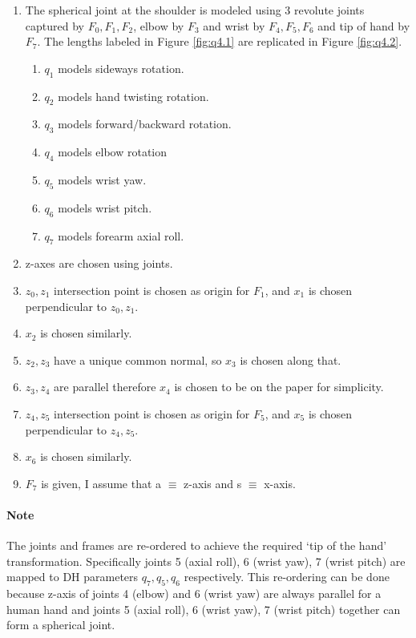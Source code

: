 \documentclass[12pt]{article}
\begin{document}
\begin{enumerate}[nolistsep]
  \item The spherical joint at the shoulder is modeled using 3 revolute joints captured by $F_0, F_1, F_2$, elbow by $F_3$ and wrist by $F_4, F_5, F_6$ and tip of hand by $F_7$. The lengths labeled in Figure \ref{fig:q4.1} are replicated in Figure \ref{fig:q4.2}.
    \begin{enumerate}[nolistsep]
      \item $q_1$ models sideways rotation.
      \item $q_2$ models hand twisting rotation.
      \item $q_3$ models forward/backward rotation.
      \item $q_4$ models elbow rotation
      \item $q_5$ models wrist yaw.
      \item $q_6$ models wrist pitch.
      \item $q_7$ models forearm axial roll.
    \end{enumerate}
  \item z-axes are chosen using joints.
  \item $z_0, z_1$ intersection point is chosen as origin for $F_1$, and $x_1$ is chosen perpendicular to $z_0, z_1$.
  \item $x_2$ is chosen similarly.
  \item $z_2, z_3$ have a unique common normal, so $x_3$ is chosen along that.
  \item $z_3, z_4$ are parallel therefore $x_4$ is chosen to be on the paper for simplicity.
  \item $z_4, z_5$ intersection point is chosen as origin for $F_5$, and $x_5$ is chosen perpendicular to $z_4, z_5$.
  \item $x_6$ is chosen similarly.
  \item $F_7$ is given, I assume that a $\equiv$ z-axis and s $\equiv$ x-axis.
\end{enumerate}

\paragraph{Note} The joints and frames are re-ordered to achieve the required `tip of the hand' transformation. Specifically joints 5 (axial roll), 6 (wrist yaw), 7 (wrist pitch) are mapped to DH parameters $q_7, q_5, q_6$ respectively. This re-ordering can be done because z-axis of joints 4 (elbow) and 6 (wrist yaw) are always parallel for a human hand and joints 5 (axial roll), 6 (wrist yaw), 7 (wrist pitch) together can form a spherical joint.
\end{document}
